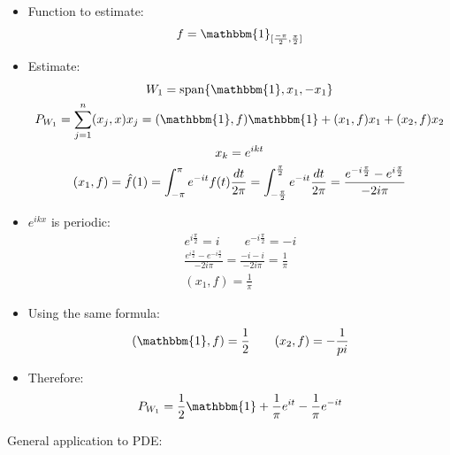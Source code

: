 \documentclass[12pt, a4paper]{article}
\begin{document}
\begin{itemize}
    \item Function to estimate:
    \begin{gather*}
        f = \mathbbm{1}_{[\frac{-\pi}{2}, \frac{\pi}{2}]}
    \end{gather*}
    \item Estimate:
    \begin{gather*}
        W_1 = \text{span}\{\mathbbm{1}, x_1, -x_1\}\\
        P_{W_1} = \sum_{j=1}^n(x_j, x)x_j = (\mathbbm{1}, f)\mathbbm{1} + (x_1, f)x_1 + (x_2, f)x_2\\
        x_k = e^{ikt}\\
        (x_1, f) = \hat{f}(1) = \int_{-\pi}^\pi e^{-it} f(t)\frac{dt}{2\pi} = \int_{-\frac{\pi}{2}}^{\frac{\pi}{2}} e^{-it}\frac{dt}{2\pi} = \frac{e^{-i\frac{\pi}{2}}- e^{i\frac{\pi}{2}}}{-2i\pi} 
    \end{gather*}   
    \item $e^{ikx}$ is periodic:
    \begin{gather*}
        e^{i\frac{\pi}{2}} = i \qquad e^{-i\frac{\pi}{2}} = -i\\
        \frac{e^{i\frac{\pi}{2}}- e^{-i\frac{\pi}{2}}}{-2i\pi} = \frac{-i-i}{-2i\pi} = \frac{1}{\pi}\\
        (x_1, f) = \frac{1}{\pi}
    \end{gather*}
    \item Using the same formula:
    \begin{gather*}
        (\mathbbm{1}, f) = \frac{1}{2} \qquad (x_2, f) = -\frac{1}{pi}
    \end{gather*}
    \item Therefore:
    \begin{gather*}
        P_{W_1} = \frac{1}{2}\mathbbm{1} + \frac{1}{\pi}e^{it} - \frac{1}{\pi}e^{-it} \\
    \end{gather*}
\end{itemize}
General application to PDE:
\end{document}
